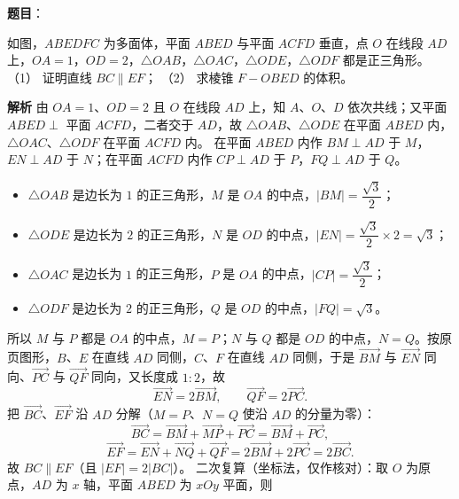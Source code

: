 \begin{answer}

\textbf{题目}：

如图，$ABEDFC$ 为多面体，平面 $ABED$ 与平面 $ACFD$ 垂直，点 $O$ 在线段 $AD$ 上，$OA=1$，$OD=2$，$\triangle OAB$，$\triangle OAC$，$\triangle ODE$，$\triangle ODF$ 都是正三角形。
（1） 证明直线 $BC\parallel EF$；
（2） 求棱锥 $F-OBED$ 的体积。
\nopagebreak[4]
\begin{center}\end{center}
\nopagebreak[4]
\textbf{解析}
由 $OA=1$、$OD=2$ 且 $O$ 在线段 $AD$ 上，知 $A$、$O$、$D$ 依次共线；又平面 $ABED\perp$ 平面 $ACFD$，二者交于 $AD$，故 $\triangle OAB$、$\triangle ODE$ 在平面 $ABED$ 内，$\triangle OAC$、$\triangle ODF$ 在平面 $ACFD$ 内。
在平面 $ABED$ 内作 $BM\perp AD$ 于 $M$，$EN\perp AD$ 于 $N$；在平面 $ACFD$ 内作 $CP\perp AD$ 于 $P$，$FQ\perp AD$ 于 $Q$。
\begin{itemize}
\item $\triangle OAB$ 是边长为 $1$ 的正三角形，$M$ 是 $OA$ 的中点，$|BM|=\dfrac{\sqrt3}{2}$；
\item $\triangle ODE$ 是边长为 $2$ 的正三角形，$N$ 是 $OD$ 的中点，$|EN|=\dfrac{\sqrt3}{2}\times2=\sqrt3$；
\item $\triangle OAC$ 是边长为 $1$ 的正三角形，$P$ 是 $OA$ 的中点，$|CP|=\dfrac{\sqrt3}{2}$；
\item $\triangle ODF$ 是边长为 $2$ 的正三角形，$Q$ 是 $OD$ 的中点，$|FQ|=\sqrt3$。
\end{itemize}
所以 $M$ 与 $P$ 都是 $OA$ 的中点，$M=P$；$N$ 与 $Q$ 都是 $OD$ 的中点，$N=Q$。按原页图形，$B$、$E$ 在直线 $AD$ 同侧，$C$、$F$ 在直线 $AD$ 同侧，于是 $\overrightarrow{BM}$ 与 $\overrightarrow{EN}$ 同向、$\overrightarrow{PC}$ 与 $\overrightarrow{QF}$ 同向，又长度成 $1:2$，故
\nopagebreak[4]
\[
\overrightarrow{EN}=2\overrightarrow{BM},\qquad \overrightarrow{QF}=2\overrightarrow{PC}.
\]
把 $\overrightarrow{BC}$、$\overrightarrow{EF}$ 沿 $AD$ 分解（$M=P$、$N=Q$ 使沿 $AD$ 的分量为零）：
\nopagebreak[4]
\[
\overrightarrow{BC}=\overrightarrow{BM}+\overrightarrow{MP}+\overrightarrow{PC}=\overrightarrow{BM}+\overrightarrow{PC},
\]
\nopagebreak[4]
\[
\overrightarrow{EF}=\overrightarrow{EN}+\overrightarrow{NQ}+\overrightarrow{QF}=2\overrightarrow{BM}+2\overrightarrow{PC}=2\overrightarrow{BC}.
\]
故 $BC\parallel EF$（且 $|EF|=2|BC|$）。
二次复算（坐标法，仅作核对）：取 $O$ 为原点，$AD$ 为 $x$ 轴，平面 $ABED$ 为 $xOy$ 平面，则

\end{answer}
